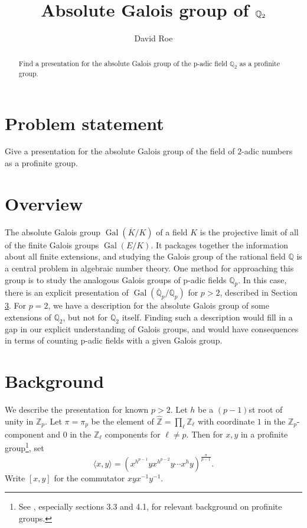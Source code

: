 \documentclass{amsart}
\title{Absolute Galois group of $\Q_2$}
\author{David Roe}
\newcommand{\Q}{\mathbb{Q}}
\newcommand{\Qp}{\mathbb{Q}_p}
\newcommand{\Z}{\mathbb{Z}}
\newcommand{\ZZ}{\mathbb{Z}}
\newcommand{\Zp}{\mathbb{Z}_p}
\newcommand{\hatZ}{\hat{\Z}}
\DeclareMathOperator{\Gal}{Gal}
\newcommand{\GQp}{\Gal(\overline{\Q}_p/\Qp)}
\begin{document}
\begin{abstract}
Find a presentation for the absolute Galois group of the p-adic field $\Q_2$ as a profinite group.
\end{abstract}

\section{Problem statement}

Give a presentation for the absolute Galois group of the field of $2$-adic numbers as a profinite group.

\section{Overview}

The absolute Galois group $\Gal(\overline{K}/K)$ of a field $K$ is the projective limit of all of the finite Galois groups $\Gal(E/K)$.  It packages together the information about all finite extensions, and studying the Galois group of the rational field $\mathbb{Q}$ is a central problem in algebraic number theory.  One method for approaching this group is to study the analogous Galois groups of p-adic fields $\mathbb{Q}_p$.  In this case, there is an explicit presentation of $\GQp$ for $p>2$, described in Section \ref{sec:background}.  For $p=2$, we have a description for the absolute Galois group of some extensions of $\mathbb{Q}_2$, but not for $\mathbb{Q}_2$ itself.  Finding such a description would fill in a gap in our explicit understanding of Galois groups, and would have consequences in terms of counting p-adic fields with a given Galois group.

\section{Background}
\label{sec:background}

We describe the presentation for known $p > 2$.  Let $h$ be a $(p-1)$st root of unity in $\Zp$.
Let $\pi = \pi_p$ be the element of $\hatZ = \prod_\ell \ZZ_\ell$ with coordinate $1$ in the $\Zp$-component and $0$ in the $\ZZ_\ell$ components for $\ell \ne p$.  Then for $x, y$ in a profinite group\footnote{See \cite{ribes-zalesskii:profinite_groups}, especially sections 3.3 and 4.1, for relevant background on profinite groups.}, set
\[
\langle x, y \rangle = (x^{h^{p-1}}y x^{h^{p-2}} y \cdots x^h y)^{\frac{\pi}{p-1}}.
\]
Write $[x,y]$ for the commutator $xyx^{-1}y^{-1}$.
\end{document}
